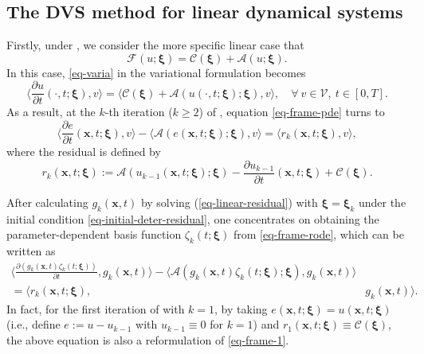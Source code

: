 \documentclass[10pt,a4paper]{article}
\numberwithin{equation}{section}
\numberwithin{lemma}{section}
\numberwithin{example}{section}
\numberwithin{definition}{section}
\numberwithin{assumption}{section}
\numberwithin{theorem}{section}
\numberwithin{proposition}{section}
\numberwithin{corollary}{section}
\numberwithin{remark}{section}
\begin{document}
\subsection{The DVS method for linear dynamical systems}
\label{sec-dvs-linear}
Firstly, under , we consider the more specific linear case that
$$
\mathcal{F}(u;\bm{\xi})=\mathcal{C}(\bm{\xi})+\mathcal{A}(u;\bm{\xi}).
$$
In this case, \eqref{eq-varia} in the variational formulation becomes 
$$
\Big\langle \frac{\partial u}{\partial t}(\cdot,t;\bm{\xi}),v\Big\rangle=\langle \mathcal{C}(\bm{\xi})+\mathcal{A}(u(\cdot,t;\bm{\xi});\bm{\xi}),v\rangle,
\quad 
\forall~ v\in \mathcal{V},~ t\in [0,T].
$$
As a result, at the $k$-th iteration ($k\ge 2$) of  ,  equation \eqref{eq-frame-pde} turns to 
\begin{equation}
    \label{eq-linear-residual}
    \Big\langle \frac{\partial e}{\partial t}(\bm{x},t;\bm{\xi}),v\Big\rangle
    -\langle \mathcal{A}(e(\bm{x},t;\bm{\xi});\bm{\xi}),v\rangle=\langle r_k(\bm{x},t;\bm{\xi}),v\rangle,
\end{equation}
where the residual is defined by 
$$
r_k(\bm{x},t;\bm{\xi}):=
\mathcal{A}(u_{k-1}(\bm{x},t;\bm{\xi});\bm{\xi})- \frac{\partial u_{k-1}}{\partial t}(\bm{x},t;\bm{\xi})+\mathcal{C}(\bm{\xi}).
$$

After calculating $g_k(\bm{x},t)$ by solving (\ref{eq-linear-residual}) with $\bm{\xi}=\bm{\xi}_k$ under the initial condition \eqref{eq-initial-deter-residual}, one concentrates on obtaining the parameter-dependent basis function 
 $\zeta_k(t;\bm{\xi})$ from 
 \eqref{eq-frame-rode}, which can be written as  
\begin{equation}
\label{halfreformulation}
\begin{aligned}
\Big\langle \frac{\partial (g_k(\bm{x},t)\zeta_k(t;\bm{\xi}))}{\partial t}, g_k(\bm{x},t)\Big\rangle -  
\langle \mathcal{A}(g_k(\bm{x},t)\zeta_k(t;\bm{\xi});\bm{\xi}),g_k(\bm{x},t)\rangle\\
=\langle r_k(\bm{x},t;\bm{\xi}),&g_k(\bm{x},t)\rangle.
\end{aligned}
\end{equation}
In fact, for the first iteration of  with
$k=1$, by taking $e(\bm{x},t;\bm{\xi})=u(\bm{x},t;\bm{\xi})$ (i.e., define $e:=u-u_{k-1}$ with $u_{k-1}\equiv 0$ for $k=1$) and $r_1(\bm{x},t;\bm{\xi}) \equiv \mathcal{C}(\bm{\xi})$, the above equation is also a reformulation of \eqref{eq-frame-1}.
\end{document}
